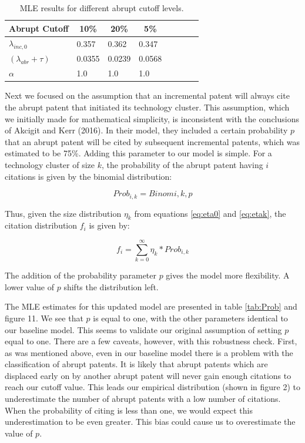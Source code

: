 \documentclass[letterpaper,12pt]{article}
\theoremstyle{definition}
\begin{document}
\begin{table}
	\caption*{MLE results for different abrupt cutoff levels.}
	\centering\label{tab:Cutoff}
	\begin{tabular}{l llp{1.5cm} p{0.5cm} llp{1.5cm}}
		\toprule
		Abrupt Cutoff & \multicolumn{1}{c}{10\%} & \multicolumn{1}{c}{20\%} & \multicolumn{1}{c}{5\%}\\ 
		\midrule
		$\lambda_{inc, 0}$ & 0.357 & 0.362 & 0.347 \\
		$(\lambda_{abr} + \tau)$ & 0.0355 & 0.0239 & 0.0568\\
		$\alpha$ & 1.0 & 1.0 & 1.0\\
		\bottomrule
	\end{tabular}
\end{table}

Next we focused on the assumption that an incremental patent will always cite the abrupt patent that initiated its technology cluster. This assumption, which we initially made for mathematical simplicity, is inconsistent with the conclusions of Akcigit and Kerr (2016). In their model, they included a certain probability $p$ that an abrupt patent will be cited by subsequent incremental patents, which was estimated to be 75\%. Adding this parameter to our model is simple. For a technology cluster of size $k$, the probability of the abrupt patent having $i$ citations is given by the binomial distribution:

\begin{equation} \label{eq:prob}
Prob_{i, k} = Binom{i, k, p}
\end{equation}

Thus, given the size distribution $\eta_k$ from equations \ref{eq:eta0} and \ref{eq:etak}, the citation distribution $f_i$ is given by:

\begin{equation} \label{eq:cit_dist}
f_i = \displaystyle\sum_{k=0}^{\infty}\eta_k * Prob_{i, k}
\end{equation}

The addition of the probability parameter $p$ gives the model more flexibility. A lower value of $p$ shifts the distribution left.

The MLE estimates for this updated model are presented in table \ref{tab:Prob} and figure 11. We see that $p$ is equal to one, with the other parameters identical to our baseline model. This seems to validate our original assumption of setting $p$ equal to one. There are a few caveats, however, with this robustness check. First, as was mentioned above, even in our baseline model there is a problem with the classification of abrupt patents. It is likely that abrupt patents which are displaced early on by another abrupt patent will never gain enough citations to reach our cutoff value. This leads our empirical distribution (shown in figure 2) to underestimate the number of abrupt patents with a low number of citations. When the probability of citing is less than one, we would expect this underestimation to be even greater. This bias could cause us to overestimate the value of $p$.
\end{document}
